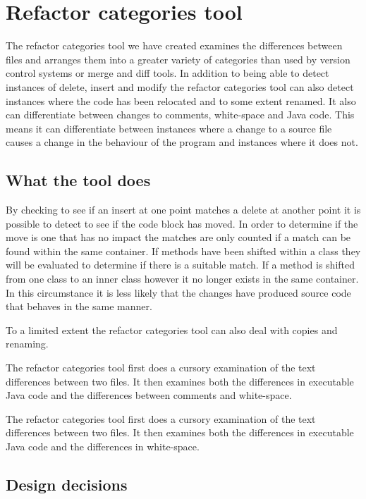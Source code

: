 
\chapter{Refactor categories tool}
The refactor categories tool we have created examines the differences between files and arranges them into a greater variety of categories than used by version control systems or merge and diff tools.  In addition to being able to detect instances of delete, insert and modify the refactor categories tool can also detect instances where the code has been relocated and to some extent renamed.  It also can differentiate between changes to comments, white-space and Java code. This means it can differentiate between instances where a change to a source file causes a change in the behaviour of the program and instances where it does not.   

\section{What the tool does}

By checking to see if an insert at one point matches a delete at another point it is possible to detect to see if the code block has moved. In order to determine if the move is one that has no impact the matches are only counted if a match can be found within the same container.  If methods have been shifted within a class they will be evaluated to determine if there is a suitable match.  If a method is shifted from one class to an inner class however it no longer exists in the same container.  In this circumstance it is less likely that the changes have produced source code that behaves in the same manner.

To a limited extent the refactor categories tool can also deal with copies and renaming.

The refactor categories tool first does a cursory examination of the text differences between two files. It then examines both the differences in executable Java code and the differences between comments and white-space. 


The refactor categories tool first does a cursory examination of the text differences between two files. It then examines both the differences in executable Java code and the differences in white-space.


\section{Design decisions}

